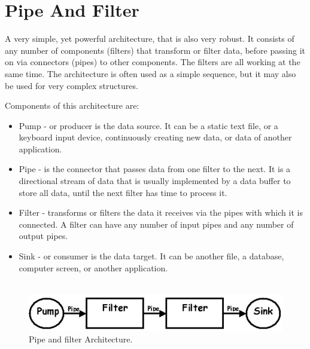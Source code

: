 \documentclass{article}
\begin{document}
\section{Pipe And Filter}
A very simple, yet powerful architecture, that is also very robust. It consists of any number of components (filters) that transform or filter data, before passing it on via connectors (pipes) to other components. The filters are all working at the same time. The architecture is often used as a simple sequence, but it may also be used for very complex structures.

\noindent Components of this architecture are:
\begin{itemize}

\item Pump - or producer is the data source. It can be a static text file, or a keyboard input device, continuously creating new data, or data of another application.
\item Pipe - is the connector that passes data from one filter to the next. It is a directional stream of data that is usually implemented by a data buffer to store all data, until the next filter has time to process it.
\item Filter - transforms or filters the data it receives via the pipes with which it is connected. A filter can have any number of input pipes and any number of output pipes.
\item Sink - or consumer is the data target. It can be another file, a database, computer screen, or another application.\\\\

\end{itemize}

\begin{figure}[h]
\centering
\includegraphics[scale=0.65]{p&f.png}
\caption{Pipe and filter Architecture.}
\label{fig_p&f}
\end{figure}


\newpage
\end{document}
